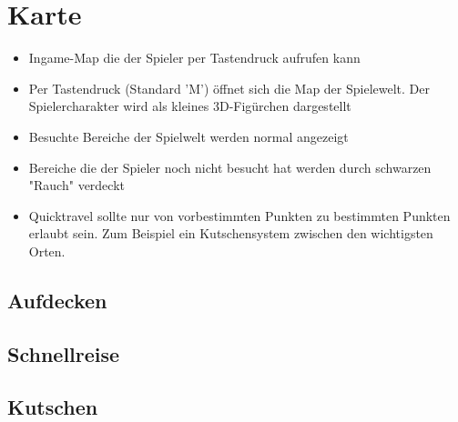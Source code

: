 \chapter{Karte}
\begin{itemize}
	\item Ingame-Map die der Spieler per Tastendruck aufrufen kann
	\item Per Tastendruck (Standard 'M') öffnet sich die Map der Spielewelt. Der Spielercharakter wird als kleines 3D-Figürchen dargestellt
	\item Besuchte Bereiche der Spielwelt werden normal angezeigt
	\item Bereiche die der Spieler noch nicht besucht hat werden durch schwarzen "Rauch" verdeckt
	\item Quicktravel sollte nur von vorbestimmten Punkten zu bestimmten Punkten erlaubt sein. Zum Beispiel ein Kutschensystem zwischen den wichtigsten Orten.
\end{itemize}

\section{Aufdecken}
\section{Schnellreise}
\section{Kutschen}